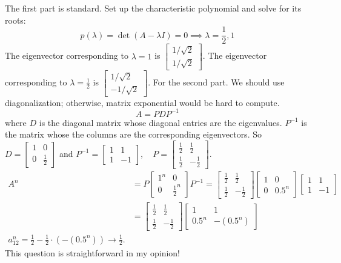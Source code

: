 \documentclass[../main]{subfiles}
\begin{document}
\begin{solution}
    The first part is standard. Set up the characteristic polynomial and solve for its roots:
    \[
    p(\lambda) = \det(A-\lambda I) = 0 \implies \lambda = \frac{1}{2}, 1
    \]
    The eigenvector corresponding to $\lambda=1$ is $\begin{bmatrix}
         1/\sqrt{2}  \\
         1/\sqrt{2} 
    \end{bmatrix}$. The eigenvector corresponding to $\lambda=\frac{1}{2}$ is $\begin{bmatrix}
        1/\sqrt{2}\\ -1/\sqrt{2}
    \end{bmatrix}$.
    \newline
    For the second part. We should use diagonalization; otherwise, matrix exponential would be hard to compute.
    \[
    A = PDP^{-1}
    \]
    where $D$ is the diagonal matrix whose diagonal entries are the eigenvalues. $P^{-1}$ is the matrix whose the columns are the corresponding eigenvectors. So $D = \begin{bmatrix}
        1 & 0\\
        0 & \frac{1}{2}
    \end{bmatrix}$ and $ P^{-1} = \begin{bmatrix}
        1 & 1\\
        1 & -1
    \end{bmatrix}, \quad P= \begin{bmatrix}
        \frac{1}{2} & \frac{1}{2}\\
        \frac{1}{2} & -\frac{1}{2}
    \end{bmatrix}$. 
    \begin{align*}
    A^n &= P \begin{bmatrix}
        1^n & 0\\
        0 & \frac{1}{2}^n
    \end{bmatrix} P^{-1} = \begin{bmatrix}
        \frac{1}{2} & \frac{1}{2}\\
        \frac{1}{2} & -\frac{1}{2}
    \end{bmatrix} \begin{bmatrix}
        1 & 0\\
        0 & 0.5^n
    \end{bmatrix} \begin{bmatrix}
        1 & 1\\
        1 & -1
    \end{bmatrix}\\
    &= \begin{bmatrix}
        \frac{1}{2} & \frac{1}{2}\\
        \frac{1}{2} & -\frac{1}{2}
    \end{bmatrix} \begin{bmatrix}
        1 & 1\\
        0.5^n & -(0.5^n)
    \end{bmatrix}\\
    a_{12}^n = \frac{1}{2} - \frac{1}{2} \cdot (-(0.5^n)) \to \frac{1}{2}.
    \end{align*}
    This question is straightforward in my opinion!
\end{solution}
\end{document}
